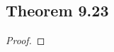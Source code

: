 \documentclass[../../main.tex]{subfiles}
\begin{document}
\subsection{Theorem 9.23}
\begin{wts}

\end{wts}
\begin{proof}

\end{proof}
\end{document}
